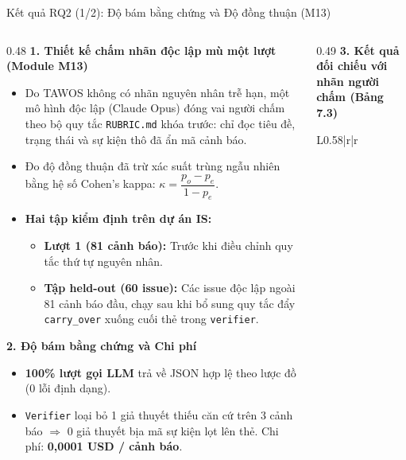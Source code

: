 \begin{frame}{Kết quả RQ2 (1/2): Độ bám bằng chứng và Độ đồng thuận (M13)}
  \scriptsize
  \begin{columns}[T,onlytextwidth]
    \begin{column}{0.48\textwidth}
      \textbf{1. Thiết kế chấm nhãn độc lập mù một lượt (Module M13)}
      \begin{itemize}
        \setlength{\itemsep}{1.2pt}
        \item Do TAWOS không có nhãn nguyên nhân trễ hạn, một mô hình độc lập (Claude Opus) đóng vai người chấm theo bộ quy tắc \texttt{RUBRIC.md} khóa trước: chỉ đọc tiêu đề, trạng thái và sự kiện thô đã ẩn mã cảnh báo.
        \item Đo độ đồng thuận đã trừ xác suất trùng ngẫu nhiên bằng hệ số Cohen's kappa: $\kappa = \dfrac{p_o - p_e}{1 - p_e}$.
        \item \textbf{Hai tập kiểm định trên dự án IS:}
          \begin{itemize}
            \scriptsize
            \setlength{\itemsep}{0.8pt}
            \item \textbf{Lượt 1 (81 cảnh báo):} Trước khi điều chỉnh quy tắc thứ tự nguyên nhân.
            \item \textbf{Tập held-out (60 issue):} Các issue độc lập ngoài 81 cảnh báo đầu, chạy sau khi bổ sung quy tắc đẩy \texttt{carry\_over} xuống cuối thẻ trong \texttt{verifier}.
          \end{itemize}
      \end{itemize}
      \vspace{0.04cm}
      \textbf{2. Độ bám bằng chứng và Chi phí}
      \begin{itemize}
        \setlength{\itemsep}{1.2pt}
        \item \textbf{100\% lượt gọi LLM} trả về JSON hợp lệ theo lược đồ (0 lỗi định dạng).
        \item \texttt{Verifier} loại bỏ 1 giả thuyết thiếu căn cứ trên 3 cảnh báo $\Rightarrow$ \alert{0 giả thuyết bịa mã sự kiện} lọt lên thẻ. Chi phí: \textbf{0,0001 USD / cảnh báo}.
      \end{itemize}
    \end{column}
    \begin{column}{0.49\textwidth}
      \textbf{3. Kết quả đối chiếu với nhãn người chấm (Bảng 7.3)}
      \vspace{0.04cm}
      \setlength{\tabcolsep}{3.5pt}
      \renewcommand{\arraystretch}{1.14}
      \begin{tabular}{L{0.58\linewidth}|r|r}

\end{tabular}
\end{column}
\end{columns}
\end{frame}
